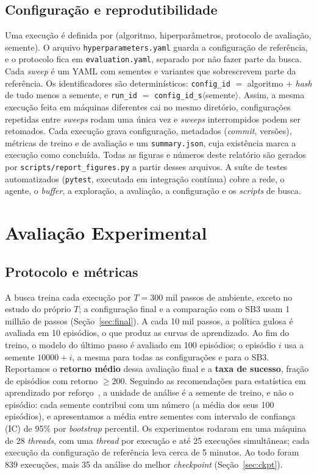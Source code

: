 \documentclass[conference]{IEEEtran}
\begin{document}
\subsection{Configuração e reprodutibilidade}
Uma execução é definida por (algoritmo, hiperparâmetros, protocolo de avaliação, semente). O arquivo \texttt{hyperparameters.yaml} guarda a configuração de referência, e o protocolo fica em \texttt{evaluation.yaml}, separado por não fazer parte da busca. Cada \textit{sweep} é um YAML com sementes e variantes que sobrescrevem parte da referência. Os identificadores são determinísticos: \texttt{config\_id} $=$ algoritmo $+$ \textit{hash} de tudo menos a semente, e \texttt{run\_id} $=$ \texttt{config\_id}\texttt{\_s}$\langle$semente$\rangle$. Assim, a mesma execução feita em máquinas diferentes cai no mesmo diretório, configurações repetidas entre \textit{sweeps} rodam uma única vez e \textit{sweeps} interrompidos podem ser retomados. Cada execução grava configuração, metadados (\textit{commit}, versões), métricas de treino e de avaliação e um \texttt{summary.json}, cuja existência marca a execução como concluída. Todas as figuras e números deste relatório são gerados por \texttt{scripts/report\_figures.py} a partir desses arquivos. A suíte de testes automatizados (\texttt{pytest}, executada em integração contínua) cobre a rede, o agente, o \textit{buffer}, a exploração, a avaliação, a configuração e os \textit{scripts} de busca.

\section{Avaliação Experimental}
\label{sec:aval}

\subsection{Protocolo e métricas}
A busca treina cada execução por $T=300$ mil passos de ambiente, exceto no estudo do próprio $T$; a configuração final e a comparação com o SB3 usam 1 milhão de passos (Seção~\ref{sec:final}). A cada 10 mil passos, a política gulosa é avaliada em 10 episódios, o que produz as curvas de aprendizado. Ao fim do treino, o modelo do último passo é avaliado em 100 episódios; o episódio $i$ usa a semente $10000+i$, a mesma para todas as configurações e para o SB3. Reportamos o \textbf{retorno médio} dessa avaliação final e a \textbf{taxa de sucesso}, fração de episódios com retorno $\ge 200$. Seguindo as recomendações para estatística em aprendizado por reforço~\cite{agarwal2021,patterson2023}, a unidade de análise é a semente de treino, e não o episódio: cada semente contribui com um número (a média dos seus 100 episódios), e apresentamos a média entre sementes com intervalo de confiança (IC) de 95\% por \textit{bootstrap} percentil. Os experimentos rodaram em uma máquina de 28 \textit{threads}, com uma \textit{thread} por execução e até 25 execuções simultâneas; cada execução da configuração de referência leva cerca de 5 minutos. Ao todo foram 839 execuções, mais 35 da análise do melhor \textit{checkpoint} (Seção~\ref{sec:ckpt}).
\end{document}
